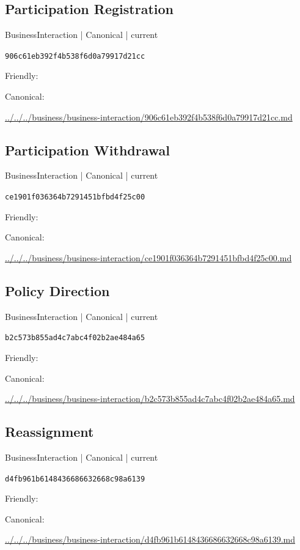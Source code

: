 \documentclass[10pt,a4paper]{article}
\begin{document}
\subsection*{Participation Registration}
{\small BusinessInteraction | Canonical | current}\par
\texttt{906c61eb392f4b538f6d0a79917d21cc}\par
Friendly: \par
Canonical: \par
{\footnotesize\url{../../../business/business-interaction/906c61eb392f4b538f6d0a79917d21cc.md}}\par
\subsection*{Participation Withdrawal}
{\small BusinessInteraction | Canonical | current}\par
\texttt{ce1901f036364b7291451bfbd4f25c00}\par
Friendly: \par
Canonical: \par
{\footnotesize\url{../../../business/business-interaction/ce1901f036364b7291451bfbd4f25c00.md}}\par
\subsection*{Policy Direction}
{\small BusinessInteraction | Canonical | current}\par
\texttt{b2c573b855ad4c7abc4f02b2ae484a65}\par
Friendly: \par
Canonical: \par
{\footnotesize\url{../../../business/business-interaction/b2c573b855ad4c7abc4f02b2ae484a65.md}}\par
\subsection*{Reassignment}
{\small BusinessInteraction | Canonical | current}\par
\texttt{d4fb961b6148436686632668c98a6139}\par
Friendly: \par
Canonical: \par
{\footnotesize\url{../../../business/business-interaction/d4fb961b6148436686632668c98a6139.md}}\par
\end{document}

